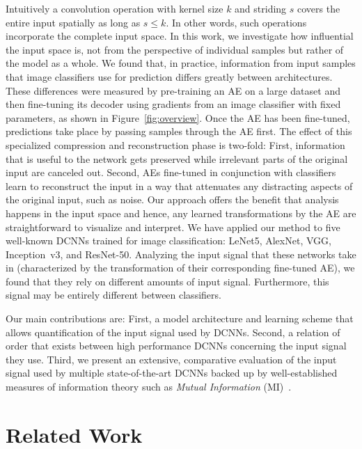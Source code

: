 \documentclass[10pt,twocolumn,a4paper]{article}
\begin{document}
Intuitively a convolution operation with kernel size $k$ and striding $s$ covers the entire input spatially as long as $s \le k$.
In other words, such operations incorporate the complete input space.
In this work, we investigate how influential the input space is, not from the perspective of individual samples but rather of the model as a whole.
We found that, in practice, information from input samples that image classifiers use for prediction differs greatly between architectures.
These differences were measured by pre-training an AE on a large dataset and then fine-tuning its decoder using gradients from an image classifier with fixed parameters, as shown in Figure~\ref{fig:overview}.
Once the AE has been fine-tuned, predictions take place by passing samples through the AE first.
The effect of this specialized compression and reconstruction phase is two-fold:
First, information that is useful to the network gets preserved while irrelevant parts of the original input are canceled out.
Second, AEs fine-tuned in conjunction with classifiers learn to reconstruct the input in a way that attenuates any distracting aspects of the original input, such as noise.
Our approach offers the benefit that analysis happens in the input space and hence, any learned transformations by the AE are straightforward to visualize and interpret.
We have applied our method to five well-known DCNNs trained for image classification: LeNet5, AlexNet, VGG, Inception~v3, and ResNet-50.
Analyzing the input signal that these networks take in (characterized by the transformation of their corresponding fine-tuned AE), we found that they rely on different amounts of input signal.
Furthermore, this signal may be entirely different between classifiers.

Our main contributions are:
First, a model architecture and learning scheme that allows quantification of the input signal used by DCNNs.
Second, a relation of order that exists between high performance DCNNs concerning the input signal they use.
Third, we present an extensive, comparative evaluation of the input signal used by multiple state-of-the-art DCNNs backed up by well-established measures of information theory such as \textit{Mutual Information} (MI)~\cite{strehl2002cluster}.



\section{Related Work}
\end{document}
